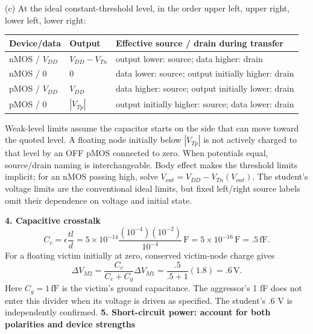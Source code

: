 \documentclass[10pt]{article}
\begin{document}
(c) At the ideal constant-threshold level, in the order upper left, upper right, lower left, lower right:
\begin{center}\begin{tabular}{p{25mm}p{44mm}p{59mm}}\toprule Device/data&Output&Effective source / drain during transfer\\\midrule
nMOS / $V_{DD}$&$V_{DD}-V_{Tn}$&output lower: source; data higher: drain\\
nMOS / 0&0&data lower: source; output initially higher: drain\\
pMOS / $V_{DD}$&$V_{DD}$&data higher: source; output initially lower: drain\\
pMOS / 0&$|V_{Tp}|$&output initially higher: source; data lower: drain\\\bottomrule\end{tabular}\end{center}
Weak-level limits assume the capacitor starts on the side that can move toward the quoted level. A floating node initially below $|V_{Tp}|$ is not actively charged to that level by an OFF pMOS connected to zero. When potentials equal, source/drain naming is interchangeable. Body effect makes the threshold limits implicit; for an nMOS passing high, solve $V_{out}=V_{DD}-V_{Tn}(V_{out})$. The student's voltage limits are the conventional ideal limits, but fixed left/right source labels omit their dependence on voltage and initial state.

\textbf{4. Capacitive crosstalk}
\[C_c=\epsilon\frac{tl}{d}=5\times10^{-14}\frac{(10^{-4})(10^{-2})}{10^{-4}}\,\mathrm F=5\times10^{-16}\,\mathrm F=.5\,\mathrm{fF}.\]
For a floating victim initially at zero, conserved victim-node charge gives
\[\Delta V_{M2}=\frac{C_c}{C_c+C_g}\Delta V_{M1}=\frac{.5}{.5+1}(1.8)=\boxed{.6\,\mathrm V}.\]
Here $C_g=1\,\mathrm{fF}$ is the victim's ground capacitance. The aggressor's 1 fF does not enter this divider when its voltage is driven as specified. The student's .6 V is independently confirmed.
\newpage
\textbf{5. Short-circuit power: account for both polarities and device strengths}
\end{document}
